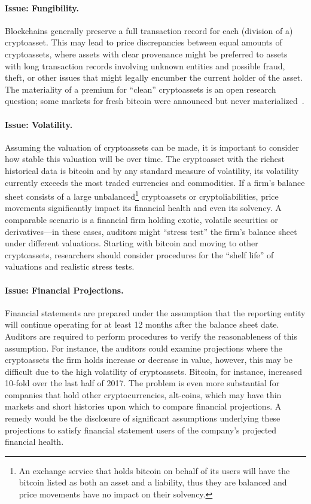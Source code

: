 \paragraph{Issue: Fungibility.} Blockchains generally preserve a full transaction record for each (division of a) cryptoasset. This may lead to price discrepancies between equal amounts of cryptoassets, where assets with clear provenance might be preferred to assets with long transaction records involving unknown entities and possible fraud, theft, or other issues that might legally encumber the current holder of the asset. The materiality of a premium for ``clean'' cryptoassets is an open research question; some markets for fresh bitcoin were announced but never materialized~\cite{moser2014towards}. 

\paragraph{Issue: Volatility.} Assuming the valuation of cryptoassets can be made, it is important to consider how stable this valuation will be over time. The cryptoasset with the richest historical data is bitcoin and by any standard measure of volatility, its volatility currently exceeds the most traded currencies and commodities. If a firm{'}s balance sheet consists of a large unbalanced\footnote{An exchange service that holds bitcoin on behalf of its users will have the bitcoin listed as both an asset and a liability, thus they are balanced and price movements have no impact on their solvency.} cryptoassets or cryptoliabilities, price movements significantly impact its financial health and even its solvency. A comparable scenario is a financial firm holding exotic, volatile securities or derivatives---in these cases, auditors might ``stress test'' the firm{'}s balance sheet under different valuations. Starting with bitcoin and moving to other cryptoassets, researchers should consider procedures for the ``shelf life'' of valuations and realistic stress tests.

\paragraph{Issue: Financial Projections.} Financial statements are prepared under the assumption that the reporting entity will continue operating for at least 12 months after the balance sheet date. Auditors are required to perform procedures to verify the reasonableness of this assumption. For instance, the auditors could examine projections where the cryptoassets the firm holds increase or decrease in value, however, this may be difficult due to the high volatility of cryptoassets. Bitcoin, for instance, increased 10-fold over the last half of 2017. The problem is even more substantial for companies that hold other cryptocurrencies, alt-coins, which may have thin markets and short histories upon which to compare financial projections. A remedy would be the disclosure of significant assumptions underlying these projections to satisfy financial statement users of the company{'}s projected financial health. 

